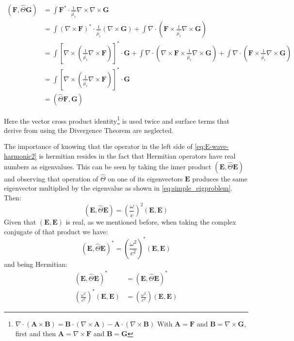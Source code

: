 \begin{align}
\left(\mathbf{F},\hat{\Theta}\mathbf{G}\right) &=
\int \mathbf{F^*}\cdot \frac{1}{\bar{\bar{\mu_r}}}\nabla\times\nabla\times \mathbf{G}\\
& = \int \left(\nabla\times\mathbf{F}\right)^*\cdot
	\frac{1}{\bar{\bar{\mu_r}}}\left(\nabla\times\mathbf{G}
	\right)+ \int \nabla\cdot\left( \mathbf{F} \times \frac{1}{\bar{\bar{\mu_r}}}\nabla\times\mathbf{G} \right)\\
&= \int \left[\nabla\times \left(\frac{1}{\bar{\bar{\mu_r}}}\nabla\times\mathbf{F}\right)\right]^*
\cdot\mathbf{G} + 
\int \nabla\cdot\left(\nabla\times\mathbf{F} \times \frac{1}{\bar{\bar{\mu_r}}}\nabla\times\mathbf{G} \right)+\int \nabla\cdot\left( \mathbf{F} \times \frac{1}{\bar{\bar{\mu_r}}}\nabla\times\mathbf{G} \right) \\
& = \int \left[\nabla\times \left(\frac{1}{\bar{\bar{\mu_r}}}\nabla\times\mathbf{F}\right)\right]^*
\cdot\mathbf{G} \\
&= \left(\hat{\Theta}\mathbf{F},\mathbf{G}\right)
\label{eq:hermiticity_proof}
\end{align}

Here the vector cross product identity\footnote{$\nabla \cdot \left(\mathbf{A}\times \mathbf{B} \right) = \mathbf{B}\cdot\left(\nabla \times \mathbf{A} \right) - \mathbf{A}\cdot\left(\nabla \times \mathbf{B} \right)$ With $\mathbf{A} = \mathbf{F}$ and $\mathbf{B} =\nabla\times\mathbf{G}$, first and then $\mathbf{A} = \nabla\times\mathbf{F}$ and $\mathbf{B} =\mathbf{G}$} is used twice and surface terms that derive from using the Divergence Theorem are neglected.

The importance of knowing that the operator in the left side of \ref{eq:E-wave-harmonic2} is hermitian resides in the fact that Hermitian operators have real numbers as eigenvalues.
This can be seen by taking the inner product $\left(\mathbf{E},\hat{\Theta}\mathbf{E}\right)$ and observing  that operation of $\hat{\Theta}$ on one of its eigenvectors $\mathbf{E}$ produces the same eigenvector multiplied by the eigenvalue as shown in \ref{eq:simple_eigproblem}. Then:
$$
\left(\mathbf{E},\hat{\Theta}\mathbf{E}\right) = \left(\frac{\omega}{c}\right)^2\left(\mathbf{E},\mathbf{E}\right)
$$
Given that $\left(\mathbf{E},\mathbf{E}\right)$ is real, as we mentioned before, when taking the complex conjugate 
of that product we have:
$$
\left(\mathbf{E},\hat{\Theta}\mathbf{E}\right)^* = \left(\frac{\omega^2}{c^2}\right)^*\left(\mathbf{E},\mathbf{E}\right)
$$
and being Hermitian: 
\begin{align*}
\left(\mathbf{E},\hat{\Theta}\mathbf{E}\right)^* &= \left(\mathbf{E},\hat{\Theta}\mathbf{E}\right)^* \\
\left(\frac{\omega^2}{c^2}\right)^*\left(\mathbf{E},\mathbf{E}\right) &= \left(\frac{\omega^2}{c^2}\right)\left(\mathbf{E},\mathbf{E}\right)
\end{align*}

